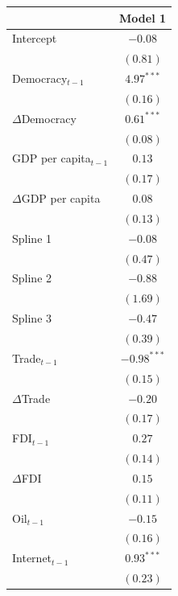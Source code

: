 \documentclass[12pt,a4paper]{article}\usepackage[]{graphicx}\usepackage[]{color}
\begin{document}
\begin{table}
\begin{center}
\begin{footnotesize}
\begin{tabular}{l c }
\hline
 & Model 1 \\
\hline
Intercept               & $-0.08$       \\
                        & $(0.81)$      \\
Democracy$_{t-1}$       & $4.97^{***}$  \\
                        & $(0.16)$      \\
$\Delta$Democracy       & $0.61^{***}$  \\
                        & $(0.08)$      \\
GDP per capita$_{t-1}$  & $0.13$        \\
                        & $(0.17)$      \\
$\Delta$GDP per capita  & $0.08$        \\
                        & $(0.13)$      \\
Spline 1                & $-0.08$       \\
                        & $(0.47)$      \\
Spline 2                & $-0.88$       \\
                        & $(1.69)$      \\
Spline 3                & $-0.47$       \\
                        & $(0.39)$      \\
Trade$_{t-1}$           & $-0.98^{***}$ \\
                        & $(0.15)$      \\
$\Delta$Trade           & $-0.20$       \\
                        & $(0.17)$      \\
FDI$_{t-1}$             & $0.27$        \\
                        & $(0.14)$      \\
$\Delta$FDI             & $0.15$        \\
                        & $(0.11)$      \\
Oil$_{t-1}$             & $-0.15$       \\
                        & $(0.16)$      \\
Internet$_{t-1}$        & $0.93^{***}$  \\
                        & $(0.23)$      \\

\end{tabular}
\end{footnotesize}
\end{center}
\end{table}
\end{document}
